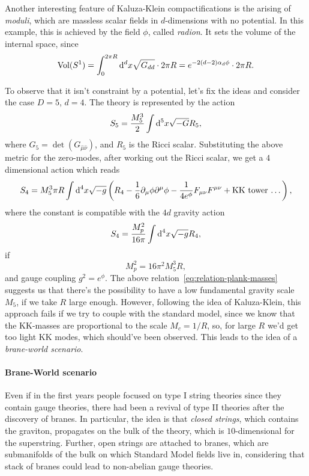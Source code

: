 Another interesting feature of Kaluza-Klein compactifications is the arising of \emph{moduli}, which are massless scalar fields in $d$-dimensions with no potential. In this example, this is achieved by the field $\phi$, called \emph{radion}. It sets the volume of the internal space, since
\begin{equation}\label{eq:radion-and-radius}
    \textup{Vol} (S^1)  = \int_{0}^{2\pi R} \mathop{}\!\mathrm{d}^d x \sqrt{G_{dd}} \cdot 2\pi R = e^{-2(d-2)\alpha_d \phi} \cdot 2\pi R .
\end{equation}

To observe that it isn't constraint by a potential, let's fix the ideas and consider the case $D=5$, $d=4$. The theory is represented by the action
\begin{equation}
    S_5 = \frac{M^3_5}{2} \int \mathop{}\!\mathrm{d}^5 x \sqrt{-G} R_5,
\end{equation}
where $G_5 = \det(G_{\hat{\mu} \hat{\nu}})$, and $R_5$ is the Ricci scalar. Substituting the above metric for the zero-modes, after working out the Ricci scalar, we get a $4$ dimensional action which reads
\begin{equation}
    S_4 = M^3_5 \pi R \int {\mathop{}\!\mathrm{d}}^4 x \sqrt{-g} \left( R_4 -\frac{1}{6} \partial_\mu \phi \partial^\mu \phi - \frac{1}{4 e^\phi} F_{\mu\nu} F^{\mu\nu} + \textup{KK tower \dots} \right),
\end{equation}
where the constant is compatible with the $4d$ gravity action
\begin{equation}
    S_4 = \frac{M^2_p}{16\pi} \int {\mathop{}\!\mathrm{d}}^4 x \sqrt{-g} R_4 ,
\end{equation}
if
\begin{equation}\label{eq:relation-plank-masses}
    M^2_p = 16 \pi^2 M^3_5 R,
\end{equation}
and gauge coupling $g^2 = e^\phi$. The above relation~\eqref{eq:relation-plank-masses} suggests us that there's the possibility to have a low fundamental gravity scale $M_5$, if we take $R$ large enough. However, following the idea of Kaluza-Klein, this approach fails if we try to couple with the standard model, since we know that the KK-masses are proportional to the scale $M_c = 1/R$, so, for large $R$ we'd get too light KK modes, which should've been observed. This leads to the idea of a \emph{brane-world scenario}.

\paragraph{Brane-World scenario}
Even if in the first years people focused on type I string theories since they contain gauge theories, there had been a revival of type II theories after the discovery of branes. In particular, the idea is that \emph{closed strings}, which contains the graviton, propagates on the bulk of the theory, which is $10$-dimensional for the superstring. Further, open strings are attached to branes, which are submanifolds of the bulk on which Standard Model fields live in, considering that stack of branes could lead to non-abelian gauge theories. 

